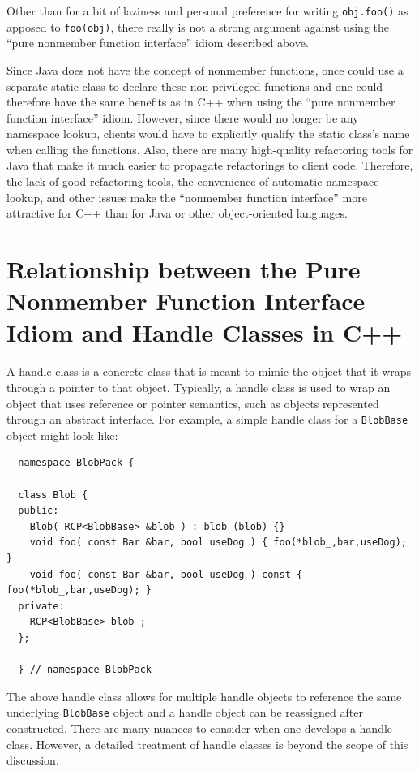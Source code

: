 \documentclass[pdf,ps2pdf,11pt]{SANDreport}
\begin{document}
Other than for a bit of laziness and personal preference for writing
{}\texttt{obj.foo()} as apposed to {}\texttt{foo(obj)}, there really is not a
strong argument against using the ``pure nonmember function interface'' idiom
described above.

Since Java does not have the concept of nonmember functions, once could use a
separate static class to declare these non-privileged functions and one could
therefore have the same benefits as in C++ when using the ``pure nonmember
function interface'' idiom.  However, since there would no longer be any
namespace lookup, clients would have to explicitly qualify the static class's
name when calling the functions.  Also, there are many high-quality
refactoring tools for Java that make it much easier to propagate refactorings
to client code.  Therefore, the lack of good refactoring tools, the
convenience of automatic namespace lookup, and other issues make the
``nonmember function interface'' more attractive for C++ than for Java or
other object-oriented languages.

%
\section{Relationship between the Pure Nonmember Function Interface Idiom and Handle Classes in C++}
%

A handle class is a concrete class that is meant to mimic the object that it
wraps through a pointer to that object.  Typically, a handle class is used to
wrap an object that uses reference or pointer semantics, such as objects
represented through an abstract interface.  For example, a simple handle class
for a {}\texttt{BlobBase} object might look like:

{\small\begin{verbatim}
  namespace BlobPack {

  class Blob {
  public:
    Blob( RCP<BlobBase> &blob ) : blob_(blob) {}
    void foo( const Bar &bar, bool useDog ) { foo(*blob_,bar,useDog); }
    void foo( const Bar &bar, bool useDog ) const { foo(*blob_,bar,useDog); }
  private:
    RCP<BlobBase> blob_;
  };

  } // namespace BlobPack
\end{verbatim}}

The above handle class allows for multiple handle objects to reference the
same underlying {}\texttt{BlobBase} object and a handle object can be
reassigned after constructed.  There are many nuances to consider when one
develops a handle class.  However, a detailed treatment of handle classes is
beyond the scope of this discussion.
\end{document}

